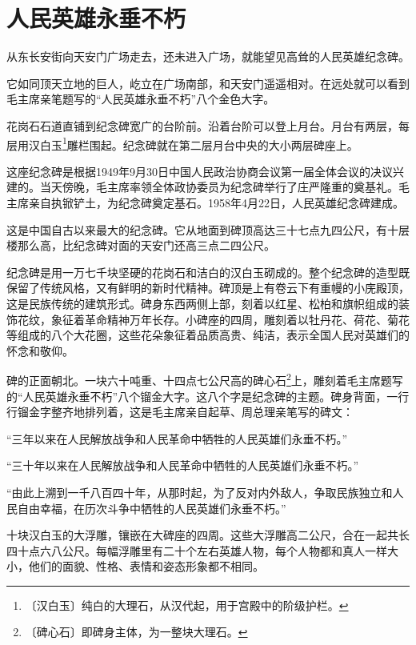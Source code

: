 \documentclass[12pt,UTF-8,openany]{ctexbook}
\begin{document}
\chapter{人民英雄永垂不朽}

\begin{large}
    
    从东长安街向天安门广场走去，还未进入广场，就能望见高耸的人民英雄纪念碑。
    
    它如同顶天立地的巨人，屹立在广场南部，和天安门遥遥相对。在远处就可以看到毛主席亲笔题写的“人民英雄永垂不朽”八个金色大字。
    
    花岗石石道直铺到纪念碑宽广的台阶前。沿着台阶可以登上月台。月台有两层，每层用汉白玉\footnote{〔汉白玉〕纯白的大理石，从汉代起，用于宫殿中的阶级护栏。}雕栏围起。纪念碑就在第二层月台中央的大小两层碑座上。
    
    这座纪念碑是根据1949年9月30日中国人民政治协商会议第一届全体会议的决议兴建的。当天傍晚，毛主席率领全体政协委员为纪念碑举行了庄严隆重的奠基礼。毛主席亲自执锨铲土，为纪念碑奠定基石。1958年4月22日，人民英雄纪念碑建成。
    
    这是中国自古以来最大的纪念碑。它从地面到碑顶高达三十七点九四公尺，有十层楼那么高，比纪念碑对面的天安门还高三点二四公尺。
    
    纪念碑是用一万七千块坚硬的花岗石和洁白的汉白玉砌成的。整个纪念碑的造型既保留了传统风格，又有鲜明的新时代精神。碑顶是上有卷云下有重幔的小庑殿顶，这是民族传统的建筑形式。碑身东西两侧上部，刻着以红星、松柏和旗帜组成的装饰花纹，象征着革命精神万年长存。小碑座的四周，雕刻着以牡丹花、荷花、菊花等组成的八个大花圈，这些花朵象征着品质高贵、纯洁，表示全国人民对英雄们的怀念和敬仰。
    
    碑的正面朝北。一块六十吨重、十四点七公尺高的碑心石\footnote{〔碑心石〕即碑身主体，为一整块大理石。}上，雕刻着毛主席题写的“人民英雄永垂不朽”八个镏金大字。这八个字是纪念碑的主题。碑身背面，一行行镏金字整齐地排列着，这是毛主席亲自起草、周总理亲笔写的碑文：
    
    “三年以来在人民解放战争和人民革命中牺牲的人民英雄们永垂不朽。”
    
    “三十年以来在人民解放战争和人民革命中牺牲的人民英雄们永垂不朽。”
    
    “由此上溯到一千八百四十年，从那时起，为了反对内外敌人，争取民族独立和人民自由幸福，在历次斗争中牺牲的人民英雄们永垂不朽。”
    
    十块汉白玉的大浮雕，镶嵌在大碑座的四周。这些大浮雕高二公尺，合在一起共长四十点六八公尺。每幅浮雕里有二十个左右英雄人物，每个人物都和真人一样大小，他们的面貌、性格、表情和姿态形象都不相同。
    

\end{large}
\end{document}
